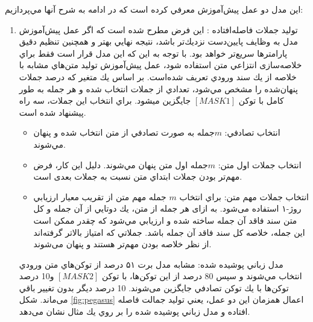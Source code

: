 این مدل دو عمل پيش‌آموزش معرفي كرده است كه در ادامه به شرح آنها مي‌پردازيم:
\begin{enumerate}
	\item {
		توليد جملات فاصله‌افتاده : اين فرض مطرح شده است كه اگر عمل پيش‌آموزش مدل به وظایف
		پايين‌دست 
		نزديك‌تر باشد، نتیجه نهايي بهتر و همچنين تنظیم دقیق پارامترها
		سريع‌تر خواهد بود. با توجه به اين كه اين مدل قرار است فقط براي خلاصه‌سازی انتزاعي متن استفاده شود، عمل
		پيش‌آموزش توليد متن‌هاي مشابه با خلاصه از يك سند ورودي تعریف شده‌است. بر اساس يك
		متغیر كه درصد جملات پنهان‌شده را مشخص مي‌شود، تعدادي از جملات انتخاب شده و هر جمله
		به طور كامل با توكن $ [MASK1] $ جايگزين ميشود. براي انتخاب اين جملات، سه راه پيشنهاد
		شده است.
		\begin{itemize}
			\item {
				انتخاب تصادفي: $ m $جمله به صورت تصادفي از متن انتخاب شده و پنهان مي‌شوند.
			}
			\item{
				انتخاب جملات اول متن: $ m $جمله اول متن پنهان مي‌شوند. دليل اين كار، فرض مهم‌تر
				بودن جملات ابتداي متن نسبت به جملات بعدی است.
			}
			\item{
				انتخاب جملات مهم متن: براي انتخاب $ m $ جمله مهم متن از تقريب معيار ارزيابي روژ-۱
				استفاده می‌شود. به ازای هر
				جمله از متن، يك دوتايي از آن جمله و كل متن سند فاقد آن جمله ساخته شده و ارزيابي
				مي‌شود كه چقدر ممکن است اين جمله، خلاصه كل سند فاقد آن جمله باشد. جملاتي
				كه امتیاز بالاتر گرفته‌اند از نظر خلاصه بودن مهم‌تر هستند و پنهان می‌شوند.
			}
			
			
		\end{itemize}
	}
	{ مدل زباني پوشيده شده: مشابه مدل برت ۵۱ درصد از توكن‌هاي متن ورودي انتخاب
		مي‌شوند و سپس 80 درصد از اين توكن‌ها، با توكن $ [MASK2] $ و10 درصد توكن‌ها با يك توكن
		تصادفي جايگزين می‌شوند. 10 درصد ديگر بدون تغيير باقي می‌ماند.
		شكل \ref{fig:pegasus} اعمال همزمان اين دو عمل، يعني توليد جمالت فاصله افتاده و مدل زباني پوشيده شده
		را بر روي يك مثال نشان می‌دهد.
	}
\end{enumerate}

